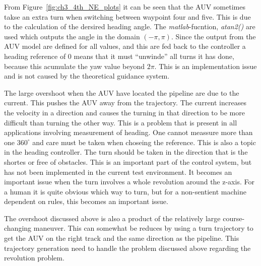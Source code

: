 		From Figure~\ref{fig:ch3_4th_NE_plots} it can be seen that the AUV sometimes takse an extra turn
		when switching between waypoint four and five. This is due to the calculation of the dersired heading
		angle. The \textit{matlab}-fucntion, \textit{atan2()} are used which outputs the angle in the
		domain $(-\pi, \pi)$. Since the output from the AUV model are defined for all values, and this
		are fed back to the controller a heading reference of 0 means that it must ``unwinde'' all
		turns it has done, because this acumulate the yaw value beyond $2\pi$. This is an
		implementation issue and is not caused by the theoretical guidance system.

		The large overshoot when the AUV have located the pipeline are due to the current. This
		pushes the AUV away from the trajectory. The current increases the velocity in a direction and
		causes the turning in that direction to be more difficult than turning the other way. This is
		a problem that is present in all applications involving measurement of heading. One cannot
		meassure more than one $360^\circ$ and care must be taken when choseing the reference. This is
		also a topic in the heading controller. The turn should be taken in the direction that is the
		shortes or free of obstacles. This is an important part of the control system, but has not
		been implemented in the current test environment. It becomes an important issue when the turn
		involves a whole revolution around the z-axis. For a human it is quite obvious which way to
		turn, but for a non-sentient machine dependent on rules, this becomes an important issue. 

		The overshoot discussed above is also a product of the relatively large course-changing
		maneuver. This can somewhat be reduces by using a turn trajectory to get the AUV on the right
		track and the same direction as the pipeline. This trajectory generation need to handle the problem
		discussed above regarding the revolution problem.
		
